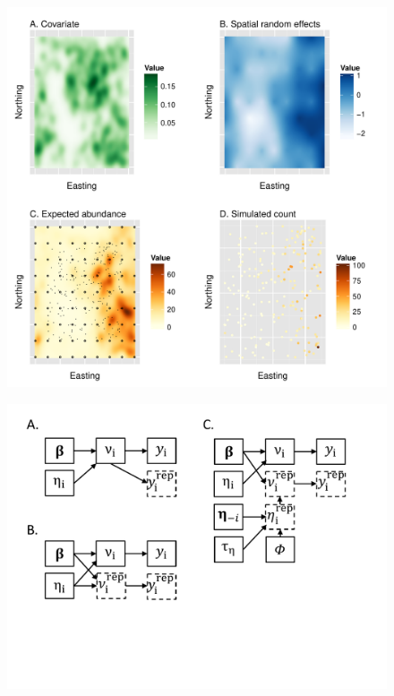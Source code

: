 \documentclass[12pt,english]{article}
\begin{document}
\begin{spacing}{1.9}
    \begin{figure}
      \begin{center}
        \includegraphics[width=170mm]{sim_count_maps.pdf}
        \caption{} \label{fig:sim_maps}
      \end{center}
    \end{figure}

    \begin{figure}
      \begin{center}
        \includegraphics[width=170mm]{posterior_prediction_diagram.pdf}
        \caption{} \label{fig:post_pred}
      \end{center}
    \end{figure}


\end{spacing}
\end{document}

